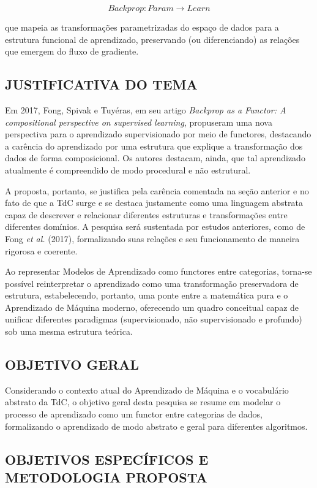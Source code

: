 \documentclass[12pt,a4paper]{article}
\begin{document}
\[
Backprop: \textit{Param} \longrightarrow \textit{Learn}
\]

que mapeia as transformações parametrizadas do espaço de dados para a estrutura funcional de aprendizado, preservando (ou diferenciando) as relações que emergem do fluxo de gradiente.

\subsection{JUSTIFICATIVA DO TEMA}
Em 2017, Fong, Spivak e Tuyéras, em seu artigo \textit{Backprop as a Functor: A compositional perspective on supervised learning}, propuseram uma nova perspectiva para o aprendizado supervisionado por meio de functores, destacando a carência do aprendizado por uma estrutura que explique a transformação dos dados de forma composicional. Os autores destacam, ainda, que tal aprendizado atualmente é compreendido de modo procedural e não estrutural.

A proposta, portanto, se justifica pela carência comentada na seção anterior e no fato de que a TdC surge e se destaca justamente como uma linguagem abstrata capaz de descrever e relacionar diferentes estruturas e transformações entre diferentes domínios. A pesquisa será sustentada por estudos anteriores, como de Fong \textit{et al.} (2017), formalizando suas relações e seu funcionamento de maneira rigorosa e coerente.

Ao representar Modelos de Aprendizado como functores entre categorias, torna-se possível reinterpretar o aprendizado como uma transformação preservadora de estrutura, estabelecendo, portanto, uma ponte entre a matemática pura e o Aprendizado de Máquina moderno, oferecendo um quadro conceitual capaz de unificar diferentes paradigmas (supervisionado, não supervisionado e profundo) sob uma mesma estrutura teórica.

\subsection{OBJETIVO GERAL}
\label{sec:obj}

Considerando o contexto atual do Aprendizado de Máquina e o vocabulário abstrato da TdC, o objetivo geral desta pesquisa se resume em modelar o processo de aprendizado como um functor entre categorias de dados, formalizando o aprendizado de modo abstrato e geral para diferentes algoritmos.

\subsection{OBJETIVOS ESPECÍFICOS E METODOLOGIA PROPOSTA}
\label{sec:exp}
\end{document}
